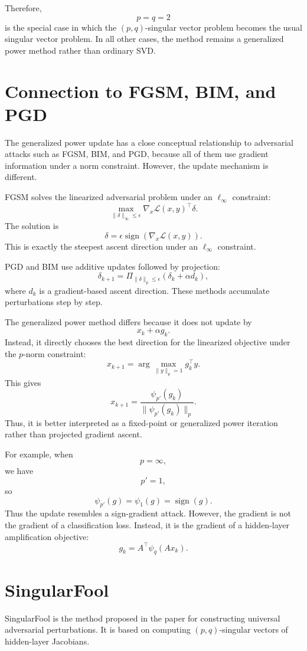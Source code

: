 \documentclass{article}
\begin{document}
Therefore,
\[
p=q=2
\]
is the special case in which the \((p,q)\)-singular vector problem becomes the usual singular vector problem. In all other cases, the method remains a generalized power method rather than ordinary SVD.

\section{Connection to FGSM, BIM, and PGD}

The generalized power update has a close conceptual relationship to adversarial attacks such as FGSM, BIM, and PGD, because all of them use gradient information under a norm constraint. However, the update mechanism is different.

FGSM solves the linearized adversarial problem under an \(\ell_\infty\) constraint:
\[
\max_{\|\delta\|_\infty\leq \epsilon}
\nabla_x \mathcal{L}(x,y)^\top \delta.
\]
The solution is
\[
\delta
=
\epsilon\operatorname{sign}(\nabla_x\mathcal{L}(x,y)).
\]
This is exactly the steepest ascent direction under an \(\ell_\infty\) constraint.

PGD and BIM use additive updates followed by projection:
\[
\delta_{k+1}
=
\Pi_{\|\delta\|_p\leq \epsilon}
\left(
\delta_k+\alpha d_k
\right),
\]
where \(d_k\) is a gradient-based ascent direction. These methods accumulate perturbations step by step.

The generalized power method differs because it does not update by
\[
x_k+\alpha g_k.
\]
Instead, it directly chooses the best direction for the linearized objective under the \(p\)-norm constraint:
\[
x_{k+1}
=
\arg\max_{\|y\|_p=1}g_k^\top y.
\]
This gives
\[
x_{k+1}
=
\frac{\psi_{p'}(g_k)}
{\|\psi_{p'}(g_k)\|_p}.
\]
Thus, it is better interpreted as a fixed-point or generalized power iteration rather than projected gradient ascent.

For example, when
\[
p=\infty,
\]
we have
\[
p'=1,
\]
so
\[
\psi_{p'}(g)=\psi_1(g)=\operatorname{sign}(g).
\]
Thus the update resembles a sign-gradient attack. However, the gradient is not the gradient of a classification loss. Instead, it is the gradient of a hidden-layer amplification objective:
\[
g_k=A^\top\psi_q(Ax_k).
\]

\section{SingularFool}

SingularFool is the method proposed in the paper for constructing universal adversarial perturbations. It is based on computing \((p,q)\)-singular vectors of hidden-layer Jacobians.
\end{document}
